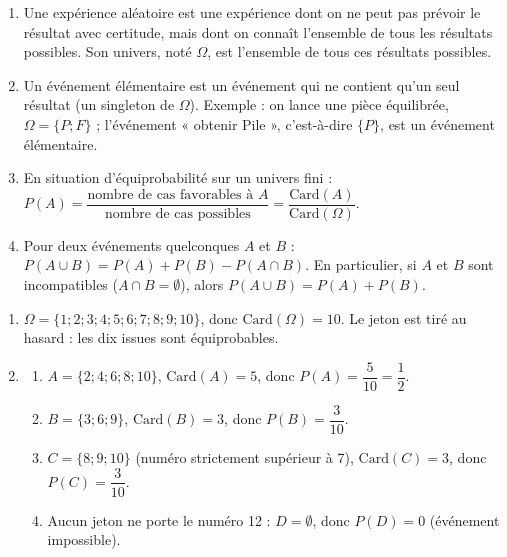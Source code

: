 \documentclass[11pt]{article}
\newcommand{\cle}[1]{{\popxbold\color{popdark}#1}}
\begin{document}
\begin{corrige}
\begin{enumerate}
\item Une \cle{expérience aléatoire} est une expérience dont on ne peut pas prévoir le résultat avec certitude, mais dont on connaît l'ensemble de tous les résultats possibles. Son \cle{univers}, noté $\Omega$, est l'ensemble de tous ces résultats possibles.
\item Un \cle{événement élémentaire} est un événement qui ne contient qu'un seul résultat (un singleton de $\Omega$). Exemple : on lance une pièce équilibrée, $\Omega = \{P ; F\}$ ; l'événement « obtenir Pile », c'est-à-dire $\{P\}$, est un événement élémentaire.
\item En situation d'équiprobabilité sur un univers fini : $P(A) = \dfrac{\text{nombre de cas favorables à } A}{\text{nombre de cas possibles}} = \dfrac{\text{Card}(A)}{\text{Card}(\Omega)}$.
\item Pour deux événements quelconques $A$ et $B$ : $P(A \cup B) = P(A) + P(B) - P(A \cap B)$. En particulier, si $A$ et $B$ sont incompatibles ($A \cap B = \emptyset$), alors $P(A \cup B) = P(A) + P(B)$.
\end{enumerate}
\end{corrige}

\begin{corrige}
\begin{enumerate}
\item $\Omega = \{1 ; 2 ; 3 ; 4 ; 5 ; 6 ; 7 ; 8 ; 9 ; 10\}$, donc $\text{Card}(\Omega) = 10$. Le jeton est tiré au hasard : les dix issues sont équiprobables.
\item 
\begin{enumerate}
\item $A = \{2 ; 4 ; 6 ; 8 ; 10\}$, $\text{Card}(A) = 5$, donc $P(A) = \dfrac{5}{10} = \dfrac{1}{2}$.
\item $B = \{3 ; 6 ; 9\}$, $\text{Card}(B) = 3$, donc $P(B) = \dfrac{3}{10}$.
\item $C = \{8 ; 9 ; 10\}$ (numéro strictement supérieur à 7), $\text{Card}(C) = 3$, donc $P(C) = \dfrac{3}{10}$.
\item Aucun jeton ne porte le numéro 12 : $D = \emptyset$, donc $P(D) = 0$ (événement impossible).
\end{enumerate}
\end{enumerate}
\end{corrige}
\end{document}
